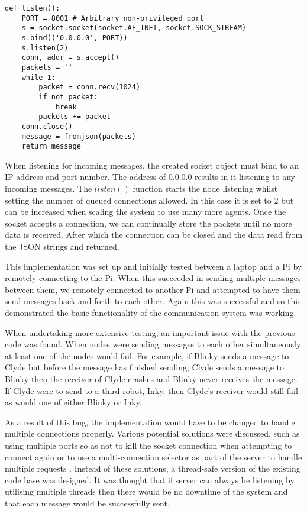 \begin{lstlisting}
def listen():
    PORT = 8001 # Arbitrary non-privileged port
    s = socket.socket(socket.AF_INET, socket.SOCK_STREAM)
    s.bind(('0.0.0.0', PORT))
    s.listen(2)
    conn, addr = s.accept()
    packets = '' 
    while 1:
        packet = conn.recv(1024)
        if not packet:
            break
        packets += packet
    conn.close()
    message = fromjson(packets)
    return message
\end{lstlisting}
When listening for incoming messages, the created socket object must bind to 
an IP address and port number. The address of 0.0.0.0 results in it listening 
to any incoming messages. The $listen()$ function starts the node listening 
whilst setting the number of queued connections allowed. In this case it is 
set to 2 but can be increased when scaling the system to use many more agents. 
Once the socket  accepts a connection, we can continually store the packets 
until no more data is received. After which the connection can be closed and 
the data read from the JSON strings and returned.

This implementation was set up and initially tested between a laptop and a Pi 
by remotely connecting to the Pi. When this succeeded in sending multiple 
messages between them, we remotely connected to another Pi and attempted to 
have them send messages back and forth to each other. Again this was successful 
and so this demonstrated the basic functionality of the communication system was 
working.

When undertaking more extensive testing, an important issue with the previous 
code was found. When nodes were sending messages to each other simultaneously 
at least one of the nodes would fail. For example, if Blinky sends a message to  
Clyde but before the message has finished sending, Clyde sends a message to 
Blinky then the receiver of Clyde crashes and Blinky never receives the message. 
If Clyde were to send to a third robot, Inky, then Clyde's receiver would still 
fail as would one of either Blinky or Inky. 

As a result of this bug, the implementation would have to be changed to handle 
multiple connections properly. Various potential solutions were discussed, 
such as using multiple ports so as not to kill the socket connection when 
attempting to connect again or to use a multi-connection selector as part of 
the server to handle multiple requests \cite{multiconnectionServer}. Instead 
of these solutions, a thread-safe version of the existing code base was 
designed. It was thought that if server can always be listening by utilising 
multiple threads then there would be no downtime of the system and that each 
message would be successfully sent.

